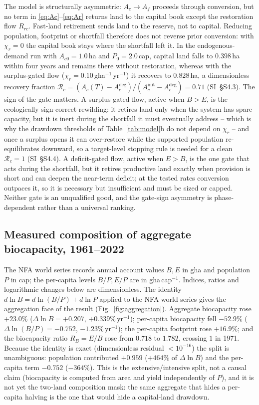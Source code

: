 \documentclass[preprint,12pt,authoryear]{elsarticle}
\begin{document}
The model is structurally asymmetric: $A_c\to A_f$ proceeds through conversion, but no term in \eqref{eq:Ac}--\eqref{eq:Ar} returns land to the capital book except the restoration flow $R_{rc}$. Fast-land retirement sends land to the reserve, not to capital. Reducing population, footprint or shortfall therefore does not reverse prior conversion: with $\chi_r=0$ the capital book stays where the shortfall left it. In the endogenous-demand run with $A_{c0}=1.0$\,ha and $P_0=2.0$\,cap, capital land falls to $0.398$\,ha within four years and remains there without restoration, whereas with the surplus-gated flow ($\chi_r=0.10$\,gha$^{-1}$\,yr$^{-1}$) it recovers to $0.828$\,ha, a dimensionless recovery fraction $\mathcal R_c=(A_c(T)-A_c^{\mathrm{deg}})/(A_c^{\mathrm{init}}-A_c^{\mathrm{deg}})=0.71$ (SI~\S S4.3). The sign of the gate matters. A surplus-gated flow, active when $B>E$, is the ecologically sign-correct rewilding: it retires land only when the system has spare capacity, but it is inert during the shortfall it must eventually address -- which is why the drawdown thresholds of Table~\ref{tab:model}b do not depend on $\chi_r$ -- and once a surplus opens it can over-restore while the supported population re-equilibrates downward, so a target-level stopping rule is needed for a clean $\mathcal R_c=1$ (SI~\S S4.4). A deficit-gated flow, active when $E>B$, is the one gate that acts during the shortfall, but it retires productive land exactly when provision is short and can deepen the near-term deficit; at the tested rates conversion outpaces it, so it is necessary but insufficient and must be sized or capped. Neither gate is an unqualified good, and the gate-sign asymmetry is phase-dependent rather than a universal ranking.

\subsection{Measured composition of aggregate biocapacity, 1961--2022}\label{sec:empirical}

The NFA world series records annual account values $B,E$ in gha and population $P$ in cap; the per-capita levels $B/P,E/P$ are in gha\,cap$^{-1}$. Indices, ratios and logarithmic changes below are dimensionless. The identity $d\ln B=d\ln(B/P)+d\ln P$ applied to the NFA world series gives the aggregation face of the result (Fig.~\ref{fig:aggregation}). Aggregate biocapacity rose $+23.0\%$ ($\Delta\ln B=+0.207$, $+0.339\%\,\mathrm{yr}^{-1}$); per-capita biocapacity fell $-52.9\%$ ($\Delta\ln(B/P)=-0.752$, $-1.23\%\,\mathrm{yr}^{-1}$); the per-capita footprint rose $+16.9\%$; and the biocapacity ratio $R_B=E/B$ rose from $0.718$ to $1.782$, crossing $1$ in 1971. Because the identity is exact (dimensionless residual $<10^{-16}$) the split is unambiguous: population contributed $+0.959$ ($+464\%$ of $\Delta\ln B$) and the per-capita term $-0.752$ ($-364\%$). This is the extensive/intensive split, not a causal claim (biocapacity is computed from area and yield independently of $P$), and it is not yet the two-land composition mask: the same aggregate that hides a per-capita halving is the one that would hide a capital-land drawdown.
\end{document}

